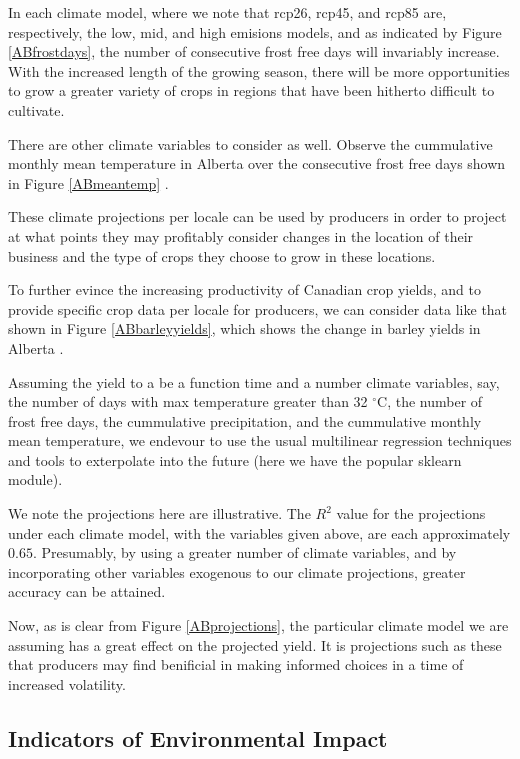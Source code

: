 \documentclass[11pt]{article}
\numberwithin{equation}{section}
\begin{document}
In each climate model, where we note that rcp26, rcp45, and rcp85 are, respectively, the low, mid, and high emisions models, and as indicated by Figure \ref{ABfrostdays}, the number of consecutive frost free days will invariably increase. With the increased length of the growing season, there will be more opportunities to grow a greater variety of crops in regions that have been hitherto difficult to cultivate.

There are other climate variables to consider as well. Observe the cummulative monthly mean temperature in Alberta over the consecutive frost free days shown in Figure \ref{ABmeantemp} \cite{climate-data}.

These climate projections per locale can be used by producers in order to project at what points they may profitably consider changes in the location of their business and the type of crops they choose to grow in these locations.

To further evince the increasing productivity of Canadian crop yields, and to provide specific crop data per locale for producers, we can consider data like that shown in Figure \ref{ABbarleyyields}, which shows the change in barley yields in Alberta \cite{stat-can}. 

Assuming the yield to a be a function time and a number climate variables, say, the number of days with max temperature greater than 32 $^\circ$C, the number of frost free days, the cummulative precipitation, and the cummulative monthly mean temperature, we endevour to use the usual multilinear regression techniques and tools to exterpolate into the future (here we have the popular sklearn module).

We note the projections here are illustrative. The $R^2$ value for the projections under each climate model, with the variables given above, are each approximately $0.65$. Presumably, by using a greater number of climate variables, and by incorporating other variables exogenous to our climate projections, greater accuracy can be attained.  

Now, as is clear from Figure \ref{ABprojections}, the particular climate model we are assuming has a great effect on the projected yield. It is projections such as these that producers may find benificial in making informed choices in a time of increased volatility.


\subsection{Indicators of Environmental Impact}\label{indicators}
\end{document}
